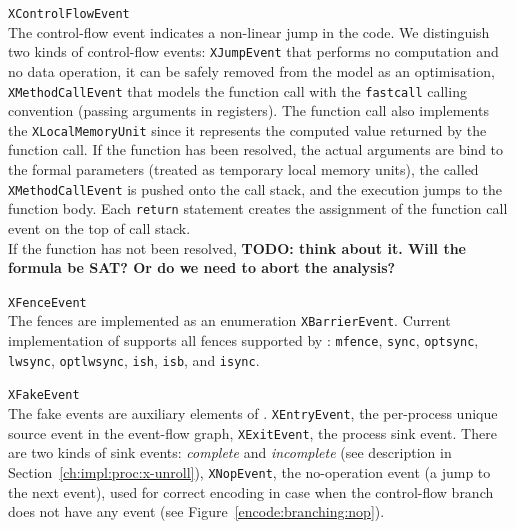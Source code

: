 \begin{outline}
  \1 \texttt{XControlFlowEvent} \\
    The control-flow event indicates a non-linear jump in the code. We distinguish two kinds of control-flow events: 
      \2 \texttt{XJumpEvent} that performs no computation and no data operation, it can be safely removed from the model as an optimisation,
      \2 \texttt{XMethodCallEvent} that models the function call with the \texttt{fastcall} calling convention (passing arguments in registers).
      The function call also implements the \texttt{XLocalMemoryUnit} since it represents the computed value returned by the function call.
      If the function has been resolved, the actual arguments are bind to the formal parameters (treated as temporary local memory units), the called \texttt{XMethodCallEvent} is pushed onto the call stack, and the execution jumps to the function body.
      Each \texttt{return} statement creates the assignment of the function call event on the top of call stack.
      \\
      If the function has not been resolved, \textbf{TODO: think about it. Will the formula be SAT? Or do we need to abort the analysis?}

  \1 \texttt{XFenceEvent} \\
    The fences are implemented as an enumeration \texttt{XBarrierEvent}.
    Current implementation of \porthos[2] supports all fences supported by \porthos[1]: 
    \texttt{mfence}, %
    \texttt{sync}, \texttt{optsync}, \texttt{lwsync}, \texttt{optlwsync}, \texttt{ish}, \texttt{isb}, and \texttt{isync}.%
    
  \1 \texttt{XFakeEvent} \\
    The fake events are auxiliary elements of \xgraph{}.
    \2 \texttt{XEntryEvent}, the per-process unique source event in the event-flow graph,
    \2 \texttt{XExitEvent}, the process sink event. There are two kinds of sink events: \textit{complete} and \textit{incomplete} (see description in Section~\ref{ch:impl:proc:x-unroll}),
    \2 \texttt{XNopEvent}, the no-operation event (a jump to the next event), used for correct encoding in case when the control-flow branch does not have any event (see Figure~\ref{encode:branching:nop}).
\end{outline}

